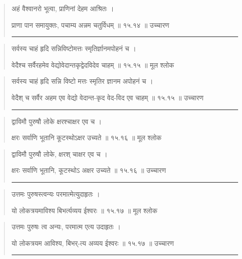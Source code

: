 \begin{quotation}

अहं वैश्वानरो भूत्वा, प्राणिनां देहम आश्रितः  ।  

प्राणा पान समायुक्तः, पचाम्य अन्नम चतुर्विधम्‌  ॥ १५.१४ ॥  उच्चारण

\noindent\rule{16cm}{0.4pt} 
\end{quotation}


\begin{quotation}

सर्वस्य चाहं हृदि सन्निविष्टोमत्तः स्मृतिर्ज्ञानमपोहनं च  ।  

वेदैश्च सर्वैरहमेव वेद्योवेदान्तकृद्वेदविदेव चाहम्‌  ॥ १५.१५ ॥  मूल श्लोक
\end{quotation}

\begin{quotation}

सर्वस्य चाहं हृदि सन्नि विष्टो
मत्तः स्मृतिर ज्ञानम अपोहनं च  ।  

वेदैश् च सर्वैर अहम एव वेद्यो 
वेदान्त-कृद वेद-विद एव चाहम्‌  ॥ १५.१५ ॥  उच्चारण

\noindent\rule{16cm}{0.4pt} 
\end{quotation}


\begin{quotation}

द्वाविमौ पुरुषौ लोके क्षरश्चाक्षर एव च  ।  

क्षरः सर्वाणि भूतानि कूटस्थोऽक्षर उच्यते  ॥ १५.१६ ॥  मूल श्लोक
\end{quotation}

\begin{quotation}

द्वाविमौ पुरुषौ लोके, क्षरश् चाक्षर एव च  ।  

क्षरः सर्वाणि भूतानि, कूटस्थोऽ अक्षर उच्यते  ॥ १५.१६ ॥  उच्चारण

\noindent\rule{16cm}{0.4pt} 
\end{quotation}


\begin{quotation}

उत्तमः पुरुषस्त्वन्यः परमात्मेत्युदाहृतः  ।  

यो लोकत्रयमाविश्य बिभर्त्यव्यय ईश्वरः  ॥ १५.१७ ॥  मूल श्लोक
\end{quotation}

\begin{quotation}

उत्तमः पुरुषः त्व अन्यः, परमात्म एत्य उदाहृतः  ।  

यो लोकत्रयम आविश्य, बिभर्-त्य अव्यय ईश्वरः  ॥ १५.१७ ॥  उच्चारण

\noindent\rule{16cm}{0.4pt} 
\end{quotation}


